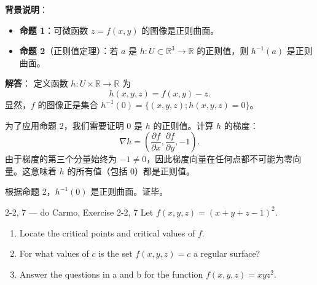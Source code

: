 \begin{solution}
\textbf{背景说明}：
\begin{itemize}
    \item \textbf{命题 1}：可微函数 $z = f(x, y)$ 的图像是正则曲面。
    \item \textbf{命题 2}（正则值定理）：若 $a$ 是 $h: U \subset \mathbb{R}^3 \to \mathbb{R}$ 的正则值，则 $h^{-1}(a)$ 是正则曲面。
\end{itemize}

\textbf{解答}：
定义函数 $h: U \times \mathbb{R} \to \mathbb{R}$ 为
\[
h(x, y, z) = f(x, y) - z.
\]
显然，$f$ 的图像正是集合 $h^{-1}(0) = \{(x, y, z); h(x, y, z) = 0\}$。

为了应用命题 2，我们需要证明 0 是 $h$ 的正则值。计算 $h$ 的梯度：
\[
\nabla h = \left( \frac{\partial f}{\partial x}, \frac{\partial f}{\partial y}, -1 \right).
\]
由于梯度的第三个分量始终为 $-1 \neq 0$，因此梯度向量在任何点都不可能为零向量。这意味着 $h$ 的所有值（包括 0）都是正则值。

根据命题 2，$h^{-1}(0)$ 是正则曲面。证毕。
\end{solution}

\begin{exercise}{2-2, 7 — do Carmo, Exercise 2-2, 7}
Let $f(x, y, z) = (x + y + z - 1)^2$.
\begin{enumerate}
\item[a.] Locate the critical points and critical values of $f$.
\item[b.] For what values of $c$ is the set $f(x, y, z) = c$ a regular surface?
\item[c.] Answer the questions in a and b for the function $f(x, y, z) = xyz^2$.
\end{enumerate}
\end{exercise}

